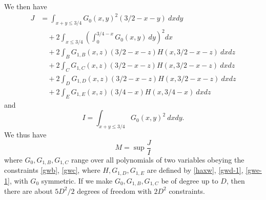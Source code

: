 \documentclass[12pt,a4paper,reqno]{amsart}
\numberwithin{equation}{section}
\theoremstyle{plain}
\theoremstyle{definition}
\begin{document}
We then have
\begin{align*} 
J &= \int_{x+y \leq 3/4} G_0(x,y)^2 (3/2-x-y)\ dx dy \\
&\quad + 2 \int_{x \leq 3/4} (\int_0^{3/4-x} G_0(x,y)\ dy)^2 dx \\
&\quad + 2 \int_B G_{1,B}(x,z) (3/2-x-z) H(x,3/2-x-z)\ dx dz \\
&\quad + 2 \int_C G_{1,C}(x,z) (3/2-x-z) H(x,3/2-x-z)\ dx dz \\
&\quad + 2 \int_D G_{1,D}(x,z) (3/2-x-z) H(x,3/2-x-z)\ dx dz \\
&\quad + 2 \int_E G_{1,E}(x,z) (3/4-x) H(x,3/4-x)\ dx dz
\end{align*}
and
$$ I = \int_{x+y \leq 3/4} G_0(x,y)^2\ dx dy.$$
We thus have
$$ M = \sup\frac{J}{I}$$
where $G_0, G_{1,B}, G_{1,C}$ range over all polynomials of two variables obeying the constraints \eqref{gwb}, \eqref{gwc}, where $H, G_{1,D}, G_{1,E}$ are defined by \eqref{haxw}, \eqref{gwd-1}, \eqref{gwe-1}, with $G_0$ symmetric.  If we make $G_0,G_{1,B}, G_{1,C}$ be of degree up to $D$, then there are about $5D^2/2$ degrees of freedom with $2D^2$ constraints.
\end{document}
